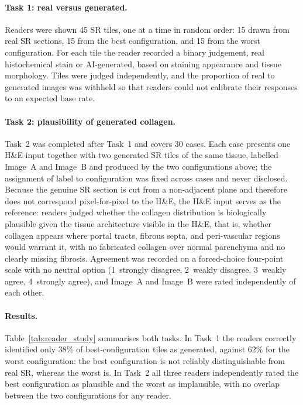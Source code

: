 \paragraph{Task 1: real versus generated.}
Readers were shown 45 SR tiles, one at a time in random order: 15 drawn from real SR
sections, 15 from the best configuration, and 15 from the worst configuration.
For each tile the reader recorded a binary judgement, real histochemical stain or
AI-generated, based on staining appearance and tissue morphology. Tiles were judged
independently, and the proportion of real to generated images was withheld so that
readers could not calibrate their responses to an expected base rate.

\paragraph{Task 2: plausibility of generated collagen.}
Task~2 was completed after Task~1 and covers 30 cases. Each case presents one H\&E input
together with two generated SR tiles of the same tissue, labelled Image~A and Image~B
and produced by the two configurations above; the assignment of label to configuration
was fixed across cases and never disclosed. Because the genuine SR section is cut from a
non-adjacent plane and therefore does not correspond pixel-for-pixel to the H\&E, the
H\&E input serves as the reference: readers judged whether the collagen distribution is
biologically plausible given the tissue architecture visible in the H\&E, that is,
whether collagen appears where portal tracts, fibrous septa, and peri-vascular regions
would warrant it, with no fabricated collagen over normal parenchyma and no clearly
missing fibrosis. Agreement was recorded on a forced-choice four-point scale with no
neutral option (1~strongly disagree, 2~weakly disagree, 3~weakly agree, 4~strongly
agree), and Image~A and Image~B were rated independently of each other.

\paragraph{Results.}
Table~\ref{tab:reader_study} summarises both tasks. In Task~1 the readers correctly
identified only $38\%$ of best-configuration tiles as generated, against $62\%$ for the
worst configuration: the best configuration is not reliably distinguishable from real
SR, whereas the worst is. In Task~2 all three readers independently rated the best
configuration as plausible and the worst as implausible, with no overlap between the two
configurations for any reader.

